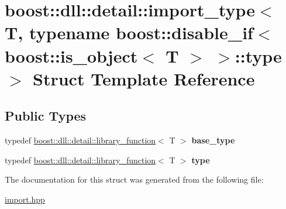 \hypertarget{a00153}{}\section{boost\+:\+:dll\+:\+:detail\+:\+:import\+\_\+type$<$ T, typename boost\+:\+:disable\+\_\+if$<$ boost\+:\+:is\+\_\+object$<$ T $>$ $>$\+:\+:type $>$ Struct Template Reference}
\label{a00153}
\subsection*{Public Types}
\begin{DoxyCompactItemize}
\item 
typedef \hyperlink{a00191}{boost\+::dll\+::detail\+::library\+\_\+function}$<$ T $>$ {\bfseries base\+\_\+type}\hypertarget{a00153_ac512d41edc93b7e364f66977cc1d51cd}{}\label{a00153_ac512d41edc93b7e364f66977cc1d51cd}

\item 
typedef \hyperlink{a00191}{boost\+::dll\+::detail\+::library\+\_\+function}$<$ T $>$ {\bfseries type}\hypertarget{a00153_af0795ef78ae101e0b7f77a18381262e4}{}\label{a00153_af0795ef78ae101e0b7f77a18381262e4}

\end{DoxyCompactItemize}


The documentation for this struct was generated from the following file\+:\begin{DoxyCompactItemize}
\item 
\hyperlink{a00570}{import.\+hpp}\end{DoxyCompactItemize}
